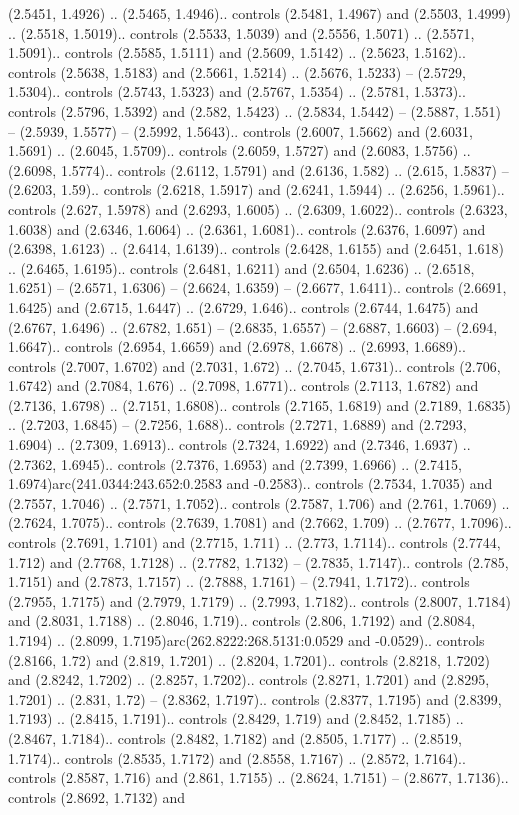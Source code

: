 (2.5451, 1.4926) .. (2.5465, 1.4946).. controls (2.5481, 1.4967) and (2.5503, 1.4999) .. (2.5518, 1.5019).. controls (2.5533, 1.5039) and (2.5556, 1.5071) .. (2.5571, 1.5091).. controls (2.5585, 1.5111) and (2.5609, 1.5142) .. (2.5623, 1.5162).. controls (2.5638, 1.5183) and (2.5661, 1.5214) .. (2.5676, 1.5233) -- (2.5729, 1.5304).. controls (2.5743, 1.5323) and (2.5767, 1.5354) .. (2.5781, 1.5373).. controls (2.5796, 1.5392) and (2.582, 1.5423) .. (2.5834, 1.5442) -- (2.5887, 1.551) -- (2.5939, 1.5577) -- (2.5992, 1.5643).. controls (2.6007, 1.5662) and (2.6031, 1.5691) .. (2.6045, 1.5709).. controls (2.6059, 1.5727) and (2.6083, 1.5756) .. (2.6098, 1.5774).. controls (2.6112, 1.5791) and (2.6136, 1.582) .. (2.615, 1.5837) -- (2.6203, 1.59).. controls (2.6218, 1.5917) and (2.6241, 1.5944) .. (2.6256, 1.5961).. controls (2.627, 1.5978) and (2.6293, 1.6005) .. (2.6309, 1.6022).. controls (2.6323, 1.6038) and (2.6346, 1.6064) .. (2.6361, 1.6081).. controls (2.6376, 1.6097) and (2.6398, 1.6123) .. (2.6414, 1.6139).. controls (2.6428, 1.6155) and (2.6451, 1.618) .. (2.6465, 1.6195).. controls (2.6481, 1.6211) and (2.6504, 1.6236) .. (2.6518, 1.6251) -- (2.6571, 1.6306) -- (2.6624, 1.6359) -- (2.6677, 1.6411).. controls (2.6691, 1.6425) and (2.6715, 1.6447) .. (2.6729, 1.646).. controls (2.6744, 1.6475) and (2.6767, 1.6496) .. (2.6782, 1.651) -- (2.6835, 1.6557) -- (2.6887, 1.6603) -- (2.694, 1.6647).. controls (2.6954, 1.6659) and (2.6978, 1.6678) .. (2.6993, 1.6689).. controls (2.7007, 1.6702) and (2.7031, 1.672) .. (2.7045, 1.6731).. controls (2.706, 1.6742) and (2.7084, 1.676) .. (2.7098, 1.6771).. controls (2.7113, 1.6782) and (2.7136, 1.6798) .. (2.7151, 1.6808).. controls (2.7165, 1.6819) and (2.7189, 1.6835) .. (2.7203, 1.6845) -- (2.7256, 1.688).. controls (2.7271, 1.6889) and (2.7293, 1.6904) .. (2.7309, 1.6913).. controls (2.7324, 1.6922) and (2.7346, 1.6937) .. (2.7362, 1.6945).. controls (2.7376, 1.6953) and (2.7399, 1.6966) .. (2.7415, 1.6974)arc(241.0344:243.652:0.2583 and -0.2583).. controls (2.7534, 1.7035) and (2.7557, 1.7046) .. (2.7571, 1.7052).. controls (2.7587, 1.706) and (2.761, 1.7069) .. (2.7624, 1.7075).. controls (2.7639, 1.7081) and (2.7662, 1.709) .. (2.7677, 1.7096).. controls (2.7691, 1.7101) and (2.7715, 1.711) .. (2.773, 1.7114).. controls (2.7744, 1.712) and (2.7768, 1.7128) .. (2.7782, 1.7132) -- (2.7835, 1.7147).. controls (2.785, 1.7151) and (2.7873, 1.7157) .. (2.7888, 1.7161) -- (2.7941, 1.7172).. controls (2.7955, 1.7175) and (2.7979, 1.7179) .. (2.7993, 1.7182).. controls (2.8007, 1.7184) and (2.8031, 1.7188) .. (2.8046, 1.719).. controls (2.806, 1.7192) and (2.8084, 1.7194) .. (2.8099, 1.7195)arc(262.8222:268.5131:0.0529 and -0.0529).. controls (2.8166, 1.72) and (2.819, 1.7201) .. (2.8204, 1.7201).. controls (2.8218, 1.7202) and (2.8242, 1.7202) .. (2.8257, 1.7202).. controls (2.8271, 1.7201) and (2.8295, 1.7201) .. (2.831, 1.72) -- (2.8362, 1.7197).. controls (2.8377, 1.7195) and (2.8399, 1.7193) .. (2.8415, 1.7191).. controls (2.8429, 1.719) and (2.8452, 1.7185) .. (2.8467, 1.7184).. controls (2.8482, 1.7182) and (2.8505, 1.7177) .. (2.8519, 1.7174).. controls (2.8535, 1.7172) and (2.8558, 1.7167) .. (2.8572, 1.7164).. controls (2.8587, 1.716) and (2.861, 1.7155) .. (2.8624, 1.7151) -- (2.8677, 1.7136).. controls (2.8692, 1.7132) and 